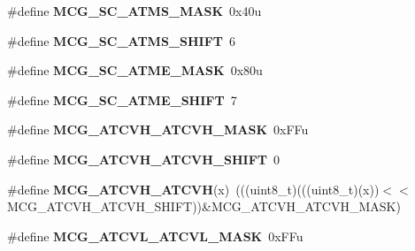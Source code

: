 \begin{DoxyCompactItemize}
\item 
\#define {\bfseries M\+C\+G\+\_\+\+S\+C\+\_\+\+A\+T\+M\+S\+\_\+\+M\+A\+SK}~0x40u\hypertarget{group__MCG__Register__Masks_gaf5a12b51cc62a0ce10f3fbecdebd0222}{}\label{group__MCG__Register__Masks_gaf5a12b51cc62a0ce10f3fbecdebd0222}

\item 
\#define {\bfseries M\+C\+G\+\_\+\+S\+C\+\_\+\+A\+T\+M\+S\+\_\+\+S\+H\+I\+FT}~6\hypertarget{group__MCG__Register__Masks_ga9a8ce406d5868276e9c3b37190ab89b1}{}\label{group__MCG__Register__Masks_ga9a8ce406d5868276e9c3b37190ab89b1}

\item 
\#define {\bfseries M\+C\+G\+\_\+\+S\+C\+\_\+\+A\+T\+M\+E\+\_\+\+M\+A\+SK}~0x80u\hypertarget{group__MCG__Register__Masks_gaf9545e815c86bd04d8513af024cb8617}{}\label{group__MCG__Register__Masks_gaf9545e815c86bd04d8513af024cb8617}

\item 
\#define {\bfseries M\+C\+G\+\_\+\+S\+C\+\_\+\+A\+T\+M\+E\+\_\+\+S\+H\+I\+FT}~7\hypertarget{group__MCG__Register__Masks_ga146594251d4266d02fecc44c1f0dd6ae}{}\label{group__MCG__Register__Masks_ga146594251d4266d02fecc44c1f0dd6ae}

\item 
\#define {\bfseries M\+C\+G\+\_\+\+A\+T\+C\+V\+H\+\_\+\+A\+T\+C\+V\+H\+\_\+\+M\+A\+SK}~0x\+F\+Fu\hypertarget{group__MCG__Register__Masks_gaf989f84acb1a8c91c7c98c2255651b00}{}\label{group__MCG__Register__Masks_gaf989f84acb1a8c91c7c98c2255651b00}

\item 
\#define {\bfseries M\+C\+G\+\_\+\+A\+T\+C\+V\+H\+\_\+\+A\+T\+C\+V\+H\+\_\+\+S\+H\+I\+FT}~0\hypertarget{group__MCG__Register__Masks_ga0fec2d450a98ab78dc7a2e4e9e33dbc6}{}\label{group__MCG__Register__Masks_ga0fec2d450a98ab78dc7a2e4e9e33dbc6}

\item 
\#define {\bfseries M\+C\+G\+\_\+\+A\+T\+C\+V\+H\+\_\+\+A\+T\+C\+VH}(x)~(((uint8\+\_\+t)(((uint8\+\_\+t)(x))$<$$<$M\+C\+G\+\_\+\+A\+T\+C\+V\+H\+\_\+\+A\+T\+C\+V\+H\+\_\+\+S\+H\+I\+FT))\&M\+C\+G\+\_\+\+A\+T\+C\+V\+H\+\_\+\+A\+T\+C\+V\+H\+\_\+\+M\+A\+SK)\hypertarget{group__MCG__Register__Masks_gab382a7e152cca964b5cd64708384c608}{}\label{group__MCG__Register__Masks_gab382a7e152cca964b5cd64708384c608}

\item 
\#define {\bfseries M\+C\+G\+\_\+\+A\+T\+C\+V\+L\+\_\+\+A\+T\+C\+V\+L\+\_\+\+M\+A\+SK}~0x\+F\+Fu\hypertarget{group__MCG__Register__Masks_ga48750526150212b524f731e303a7e3cf}{}\label{group__MCG__Register__Masks_ga48750526150212b524f731e303a7e3cf}


\end{DoxyCompactItemize}
